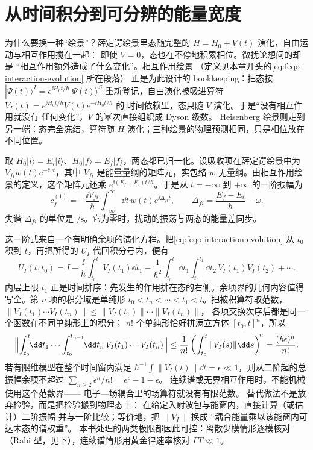 \section{从时间积分到可分辨的能量宽度}
\label{chap:feqo-finite-time}

为什么要换一种“绘景”？薛定谔绘景里态随完整的
\(H=H_0+V(t)\) 演化，自由运动与相互作用搅在一起：
即使 \(V=0\)，态也在不停地积累相位。微扰论想问的却是
“相互作用额外造成了什么变化”。相互作用绘景
（定义见本章开头的\cref{eq:feqo-interaction-evolution} 所在段落）
正是为此设计的 bookkeeping：把态按
\(|\Psi(t)\rangle^I=e^{\ii H_0t/\hbar}|\Psi(t)\rangle^S\)
重新登记，自由演化被吸进算符
\(V_I(t)=e^{\ii H_0t/\hbar}V(t)e^{-\ii H_0t/\hbar}\) 的
时间依赖里，态只随 \(V\) 演化。于是“没有相互作用就没有
任何变化”，\(V\) 的幂次直接组织成 Dyson 级数。
Heisenberg 绘景则走到另一端：态完全冻结，算符随 \(H\)
演化；三种绘景的物理预测相同，只是相位放在不同位置。

取 \(H_0|i\rangle=E_i|i\rangle\)、\(H_0|f\rangle=E_f|f\rangle\)，两态都已归一化。设吸收项在薛定谔绘景中为 \(V_{fi}w(t)e^{-\ii\omega t}\)，其中 \(V_{fi}\) 是能量量纲的矩阵元，实包络 \(w\) 无量纲。由相互作用绘景的定义，这个矩阵元还乘 \(e^{\ii(E_f-E_i)t/\hbar}\)。于是从 \(t=-\infty\) 到 \(+\infty\) 的一阶振幅为
\begin{equation}
c_f^{(1)}=-\frac{\ii V_{fi}}{\hbar}\int_{-\infty}^{\infty}\dd t\,w(t)e^{\ii\Delta_{fi}t},\qquad
\Delta_{fi}=\frac{E_f-E_i}{\hbar}-\omega .
\label{eq:feqo-finite-time-amplitude}
\end{equation}
失谐 \(\Delta_{fi}\) 的单位是 \(\si{\per\second}\)。它为零时，扰动的振荡与两态的能量差同步。

这一阶式来自一个有明确余项的演化方程。把\cref{eq:feqo-interaction-evolution} 从 \(t_0\) 积到 \(t\)，再把所得的 \(U_I\) 代回积分号内，便有
\[
U_I(t,t_0)=I-\frac{\ii}{\hbar}\int_{t_0}^t V_I(t_1)\dd t_1
-\frac1{\hbar^2}\int_{t_0}^t\dd t_1\int_{t_0}^{t_1}\dd t_2\,
V_I(t_1)V_I(t_2)+\cdots.
\]
内层上限 \(t_1\) 正是时间排序：先发生的作用排在态的右侧。余项界的几何内容值得写全。第 \(n\) 项的积分域是单纯形
\(t_0<t_n<\cdots<t_1<t\)。把被积算符取范数，
\(\|V_I(t_1)\cdots V_I(t_n)\|\le\|V_I(t_1)\|\cdots\|V_I(t_n)\|\)，
各项交换次序后都是同一个函数在不同单纯形上的积分；
\(n!\) 个单纯形恰好拼满立方体 \([t_0,t]^n\)，所以
\[
\Bigl\|\int_{t_0}^t\!\!\dd t_1\cdots\int_{t_0}^{t_{n-1}}\!\!\dd t_n\,
V_I(t_1)\cdots V_I(t_n)\Bigr\|
\le\frac1{n!}\left(\int_{t_0}^t\|V_I(s)\|\dd s\right)^{\!n}
=\frac{(\hbar\epsilon)^n}{n!}.
\]
若有限维模型在整个时间窗内满足
\(\hbar^{-1}\int\|V_I(t)\|\dd t=\epsilon\ll1\)，则从二阶起的总振幅余项不超过
\(\sum_{n\ge2}\epsilon^n/n!=e^\epsilon-1-\epsilon\)。
连续谱或无界相互作用时，不能机械使用这个范数界——
电子—场耦合里的场算符就没有有限范数。
替代做法不是放弃检验，而是把检验搬到物理态上：
在给定入射波包与能窗内，直接计算（或估计）二阶振幅
并与一阶比较；等价地，把 \(\|V_I\|\) 换成
“耦合能量乘以该能窗内可达末态的谱权重”。
本书处理的两类极限都因此可控：离散少模情形逐模核对
（Rabi 型，见下），连续谱情形用黄金律速率核对
\(\Gamma T\ll1\)。

